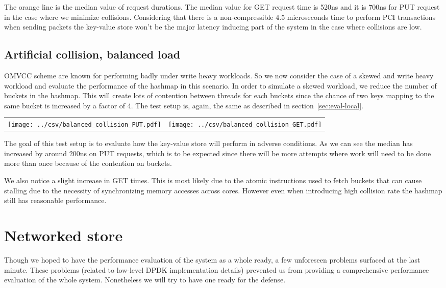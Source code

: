The orange line is the median value of request durations. The median
value for GET request time is 520ns and it is 700ns for PUT request in
the case where we minimize collisions. Considering that there is a
non-compressible 4.5 microseconds time to perform PCI transactions
when sending packets the key-value store won't be the major latency
inducing part of the system in the case where collisions are low.

\subsection{Artificial collision, balanced load}

OMVCC scheme are known for performing badly under write heavy
workloads. So we now consider the case of a skewed and write heavy
workload and evaluate the performance of the hashmap in this
scenario. In order to simulate a skewed workload, we reduce the number
of buckets in the hashmap. This will create lots of contention between
threads for each buckets since the chance of two keys mapping to the
same bucket is increased by a factor of 4. The test setup is, again,
the same as described in section~\ref{sec:eval-local}.

\begin{center}
  \begin{tabular}{c c} \label{table:col-balanced}
    \texttt{[image: ../csv/balanced\_collision\_PUT.pdf]}
    &
      \texttt{[image: ../csv/balanced\_collision\_GET.pdf]}
  \end{tabular}
\end{center}

The goal of this test setup is to evaluate how the key-value store
will perform in adverse conditions. As we can see the median has
increased by around 200ns on PUT requests, which is to be expected
since there will be more attempts where work will need to be done more
than once because of the contention on buckets.

We also notice a slight increase in GET times. This is most likely due
to the atomic instructions used to fetch buckets that can cause
stalling due to the necessity of synchronizing memory accesses across
cores. However even when introducing high collision rate the hashmap
still has reasonable performance.

\section{Networked store}

Though we hoped to have the performance evaluation of the system as a
whole ready, a few unforeseen problems surfaced at the last
minute. These problems (related to low-level DPDK implementation
details) prevented us from providing a comprehensive performance
evaluation of the whole system. Nonetheless we will try to have one
ready for the defense.

